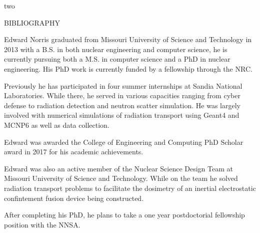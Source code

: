 \documentclass[times,12pt,titlepage]{mstthesis}
\begin{document}
\begin{ThesisBody}



 

\end{ThesisBody}

\begin{ThesisAppendix}{two}



\end{ThesisAppendix}


\begin{ThesisBibliography}{BIBLIOGRAPHY}


\end{ThesisBibliography}


\begin{Vita}
Edward Norris graduated from Missouri University of Science and Technology in 2013 with a B.S. in both nuclear engineering and computer science, he is currently pursuing both a M.S. in computer science and a PhD in nuclear engineering. His PhD work is currently funded by a fellowship through the NRC.

Previously he has participated in four summer internships at Sandia National Laboratories. While there, he served in various capacities ranging from cyber defense to radiation detection and neutron scatter simulation. He was largely involved with numerical simulations of radiation transport using Geant4 and MCNP6 as well as data collection.

Edward was awarded the College of Engineering and Computing PhD Scholar award in 2017 for his academic achievements.

Edward was also an active member of the Nuclear Science Design Team at Missouri University of Science and Technology. While on the team he solved radiation transport problems to facilitate the dosimetry of an inertial electrostatic confintement fusion device being constructed.

After completing his PhD, he plans to take a one year postdoctorial fellowship position with the NNSA.


\end{Vita}
\end{document}
